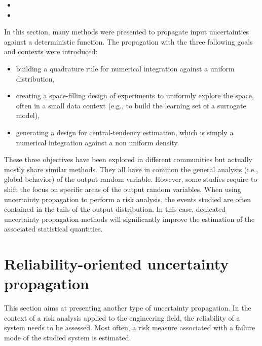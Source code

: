 \begin{itemize}
    \item {}
    \item {}
\end{itemize}

In this section, many methods were presented to propagate input uncertainties against a deterministic function.
The propagation with the three following goals and contexts were introduced: 
\begin{itemize}
    \item building a quadrature rule for numerical integration against a uniform distribution,
    \item creating a space-filling design of experiments to uniformly explore the space, often in a small data context (e.g., to build the learning set of a surrogate model),
    \item generating a design for central-tendency estimation, which is simply a numerical integration against a non uniform density.
\end{itemize} 
These three objectives have been explored in different communities but actually mostly share similar methods. 
They all have in common the general analysis (i.e., global behavior) of the output random variable. 
However, some studies require to shift the focus on specific areas of the output random variables.
When using uncertainty propagation to perform a risk analysis, the events studied are often contained in the tails of the output distribution. 
In this case, dedicated uncertainty propagation methods will significantly improve the estimation of the associated statistical quantities.


\section{Reliability-oriented uncertainty propagation}

This section aims at presenting another type of uncertainty propagation. 
In the context of a risk analysis applied to the engineering field, the reliability of a system needs to be assessed. 
Most often, a risk measure associated with a failure mode of the studied system is estimated. 

